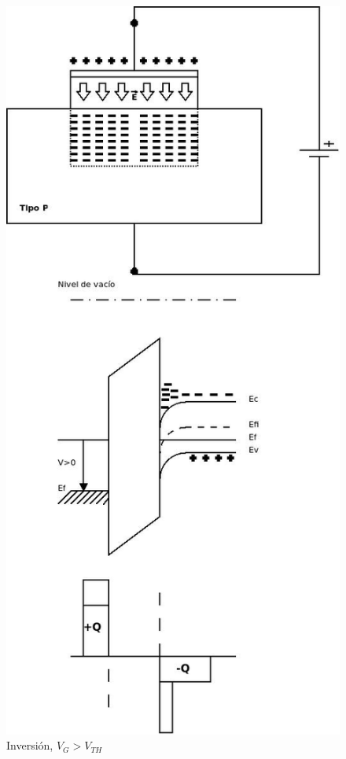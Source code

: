 \documentclass[oneside]{book}
\numberwithin{equation}{section}
\numberwithin{figure}{section}
\numberwithin{table}{section}
\begin{document}
				\begin{minipage}[t]{0.4\textwidth}	
					\begin{figure}[H]
						\begin{center}
							\includegraphics[scale=0.4]{MOS-Inv.jpeg}
							\caption{Inversión, $V_G>V_{TH}$}
						\end{center}
					\end{figure}	
				\end{minipage}	
				
\end{document}
